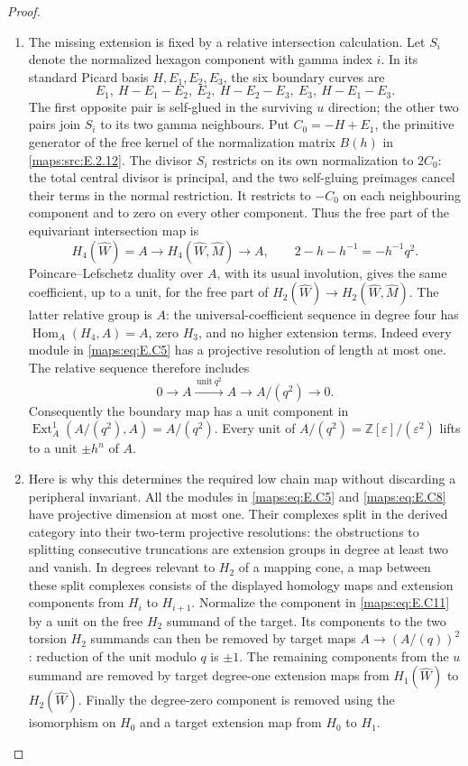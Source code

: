 \begin{proof}
\begin{enumerate}[label=\arabic*.,leftmargin=*]
\item The missing extension is fixed by a relative intersection
calculation. Let $S_i$ denote the normalized hexagon
component with gamma index $i$. In its standard Picard
basis $H,E_1,E_2,E_3$, the six boundary curves are
\[
 E_1,\ H-E_1-E_2,\ E_2,\ H-E_2-E_3,
                       \ E_3,\ H-E_1-E_3.
 \tag{E.C9}\label{maps:eq:E.C9}
\]
The first opposite pair is self-glued in the surviving
$u$ direction; the other two pairs join $S_i$ to its
two gamma neighbours. Put $C_0=-H+E_1$, the primitive
generator of the free kernel of the normalization matrix
$B(h)$ in \ref{maps:src:E.2.12}. The divisor $S_i$ restricts on its
own normalization to $2C_0$: the total central divisor
is principal, and the two self-gluing preimages cancel
their terms in the normal restriction. It restricts
to $-C_0$ on each neighbouring component and to zero
on every other component. Thus the free part of the
equivariant intersection map is
\[
 H_4(\widehat W)=A\longrightarrow
 H_4(\widehat W,\widehat M)\longrightarrow A,
 \qquad 2-h-h^{-1}=-h^{-1}q^2.
 \tag{E.C10}\label{maps:eq:E.C10}
\]
Poincare--Lefschetz duality over $A$, with its usual
involution, gives the same coefficient, up to a unit,
for the free part of $H_2(\widehat W)\to
H_2(\widehat W,\widehat M)$. The latter relative group
is $A$: the universal-coefficient sequence in degree
four has $\operatorname{Hom}_A(H_4,A)=A$, zero $H_3$,
and no higher extension terms. Indeed every module
in \eqref{maps:eq:E.C5} has a projective resolution of length at
most one. The relative sequence therefore includes
\[
 0\longrightarrow A\xrightarrow{\,\text{unit}\ q^2\,}A
  \longrightarrow A/(q^2)\longrightarrow0.
 \tag{E.C11}\label{maps:eq:E.C11}
\]
Consequently the boundary map has a unit component in
$\operatorname{Ext}^1_A(A/(q^2),A)=A/(q^2)$.
Every unit of $A/(q^2)=\mathbb Z[\varepsilon]/(\varepsilon^2)$
lifts to a unit $\pm h^n$ of $A$.

\item Here is why this determines the required low chain map
without discarding a peripheral invariant. All the
modules in \eqref{maps:eq:E.C5} and \eqref{maps:eq:E.C8} have projective dimension
at most one. Their complexes split in the derived
category into their two-term projective resolutions:
the obstructions to splitting consecutive truncations
are extension groups in degree at least two and vanish.
In degrees relevant to $H_2$ of a mapping cone, a map
between these split complexes consists of the displayed
homology maps and extension components from $H_i$ to
$H_{i+1}$. Normalize the component in \eqref{maps:eq:E.C11} by a unit
on the free $H_2$ summand of the target. Its components
to the two torsion $H_2$ summands can then be removed
by target maps $A\to(A/(q))^2$: reduction of the unit
modulo $q$ is $\pm1$. The remaining components from
the $u$ summand are removed by target degree-one
extension maps from $H_1(\widehat W)$ to
$H_2(\widehat W)$. Finally the degree-zero component
is removed using the isomorphism on $H_0$ and a target
extension map from $H_0$ to $H_1$.


\end{enumerate}
\end{proof}
